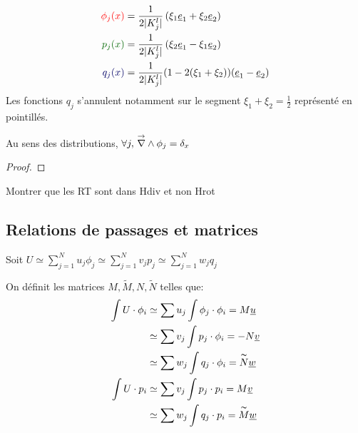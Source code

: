 \begin{minipage}{0.45\textwidth}
\begin{align*}
	\color{red}{\phi_j(x)} &= \frac{1}{2|K_j^l|}\left(\xi_1 \v e_1 + \xi_2 \v e_2\right)\\
	\color{black!60!green}{p_j(x)} &= \frac{1}{2|K_j^l|}\left(\xi_2 \v e_1 -\xi_1 \v e_2\right)\\
	\color{black!60!blue}{q_j(x)} &= \frac{1}{2|K_j^l|}(1-2(\xi_1+\xi_2))(\v e_1 -\v e_2)
\end{align*}
Les fonctions \(q_j\) s'annulent notamment sur le segment \(\xi_1+\xi_2=\frac{1}{2}\) représenté en pointillés. 
\end{minipage}
\begin{minipage}{0.53\textwidth}
	\centering
	\begin{tikzpicture}[scale=2.5]
	
	\end{tikzpicture}
\end{minipage}

\begin{prop}
Au sens des distributions, \(\forall j,\, \vrot \phi_j =
\delta_x\)
\end{prop}
\begin{proof}
\end{proof}

\begin{TODO}
  Montrer que les RT sont dans Hdiv et non Hrot
\end{TODO}

\subsection{Relations de passages et matrices}
Soit \( U \simeq \sum\limits_{j=1}^N u_j \phi_j \simeq \sum\limits_{j=1}^N v_j p_j \simeq \sum\limits_{j=1}^N w_j q_j\)

On définit les matrices \(M,\tilde M, N,\tilde N\) telles que:
\begin{align*}
  \int U \cdot \phi_i &\simeq \sum u_j \int \phi_j \cdot \phi_i = M\v u \\
  & \simeq \sum v_j \int p_j \cdot \phi_i = -N\v v\\
  & \simeq \sum w_j \int q_j \cdot \phi_i = \tilde{N}\v w \\
  \int U \cdot p_i &\simeq \sum v_j \int p_j \cdot p_i = M\v v \\
  &\simeq \sum w_j \int q_j \cdot p_i = \tilde M\v w
\end{align*}
